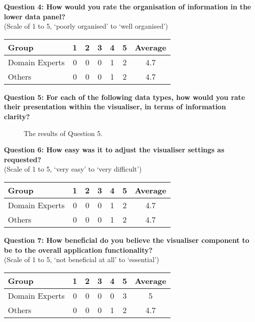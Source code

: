 \noindent\textbf{Question 4: How would you rate the organisation of information in the lower data panel?}\\(Scale of 1 to 5, `poorly organised' to `well organised')

\begin{center}
\begin{tabular}{ l c c c c c c }
 Group & 1 & 2 & 3 & 4 & 5 & Average \\ 
 \hline
 Domain Experts & 0 & 0 & 0 & 1 & 2 & 4.7 \\
 Others 		& 0 & 0 & 0 & 1 & 2 & 4.7 \\
\end{tabular}
\end{center}

\clearpage
\noindent\textbf{Question 5: For each of the following data types, how would you rate their presentation within the visualiser, in terms of information clarity?}

\begin{figure}[h]
	\centering
	\decoRule
	\caption[Evaluation Questionnaire Question 5 Results]{The results of Question 5.}
	\label{fig:VisualisationLikert}
\end{figure}

\noindent\textbf{Question 6: How easy was it to adjust the visualiser settings as requested?}\\(Scale of 1 to 5, `very easy' to `very difficult')

\begin{center}
\begin{tabular}{ l c c c c c c }
 Group & 1 & 2 & 3 & 4 & 5 & Average \\ 
 \hline
 Domain Experts & 0 & 0 & 0 & 1 & 2 & 4.7 \\
 Others 		& 0 & 0 & 0 & 1 & 2 & 4.7 \\
\end{tabular}
\end{center}

\noindent\textbf{Question 7: How beneficial do you believe the visualiser component to be to the overall application functionality?}\\(Scale of 1 to 5, `not beneficial at all' to `essential')

\begin{center}
\begin{tabular}{ l c c c c c c }
 Group & 1 & 2 & 3 & 4 & 5 & Average \\ 
 \hline
 Domain Experts & 0 & 0 & 0 & 0 & 3 & 5 \\
 Others 		& 0 & 0 & 0 & 1 & 2 & 4.7 \\
\end{tabular}
\end{center}

